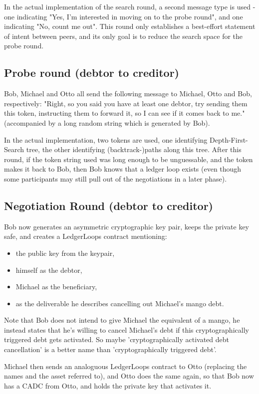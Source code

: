 \documentclass[11pt,twoside,a4paper]{article}
\begin{document}
In the actual implementation of the
search round, a second message type is used - one indicating "Yes, I'm interested in moving on to the probe round",
and one indicating "No, count me out". 
This round only establishes a best-effort statement of intent between peers, and its only
goal is to reduce the search space for the probe round.

\subsection{Probe round (debtor to creditor)}
Bob, Michael and Otto all send the following message to Michael, Otto and Bob, respectively:
"Right, so you said you have at least one debtor, try sending them this token, instructing them to forward it,
so I can see if it comes back to me." (accompanied by a long random string which is generated by Bob).

In the actual implementation, two tokens are used, one identifying Depth-First-Search tree, the other identifying
(backtrack-)paths along this tree.
After this round, if the token string used was long enough to be unguessable, and the token makes it back to Bob,
then Bob knows that a ledger loop exists (even though some participants may still pull out of the negotiations
in a later phase).

\subsection{Negotiation Round (debtor to creditor)}
Bob now generates an asymmetric cryptographic key pair, keeps the private key safe, and creates
a LedgerLoops contract mentioning:
\begin{itemize}
\item the public key from the keypair,
\item himself as the debtor,
\item Michael as the beneficiary,
\item as the deliverable he describes cancelling out Michael's mango debt.
\end{itemize}

Note that Bob does not intend to give Michael the equivalent of a mango, he instead states that he's willing to cancel
Michael's debt if this cryptographically triggered debt gets activated. So maybe 'cryptographically activated debt cancellation'
 is a better name than 'cryptographically triggered debt'.

Michael then sends an analoguous LedgerLoops contract to Otto (replacing the names and the asset referred to), and Otto does the
same again, so that Bob now has a CADC from Otto, and holds the private key that activates it.
\end{document}
